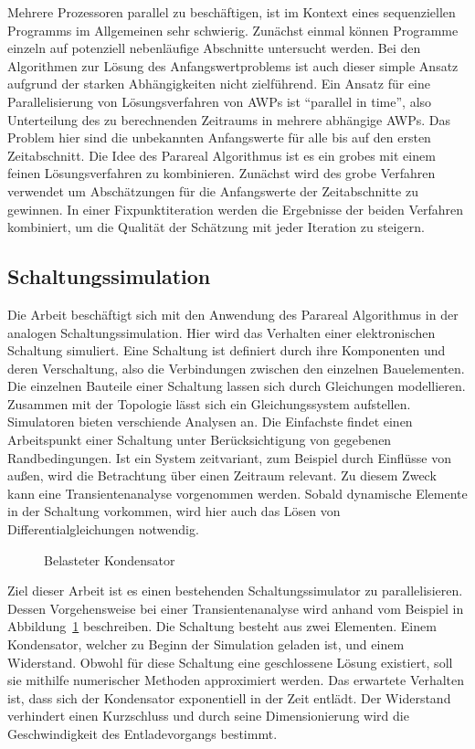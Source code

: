 Mehrere Prozessoren parallel zu beschäftigen, ist im Kontext eines sequenziellen Programms im Allgemeinen sehr schwierig. Zunächst einmal können Programme einzeln auf potenziell nebenläufige Abschnitte untersucht werden. Bei den Algorithmen zur Lösung des Anfangswertproblems ist auch dieser simple Ansatz aufgrund der starken Abhängigkeiten nicht zielführend. Ein Ansatz für eine Parallelisierung von Lösungsverfahren von AWPs ist "`parallel in time"', also Unterteilung des zu berechnenden Zeitraums in mehrere abhängige AWPs. Das Problem hier sind die unbekannten Anfangswerte für alle bis auf den ersten Zeitabschnitt. Die Idee des Parareal Algorithmus ist es ein grobes mit einem feinen Lösungsverfahren zu kombinieren. Zunächst wird des grobe Verfahren verwendet um Abschätzungen für die Anfangswerte der Zeitabschnitte zu gewinnen. In einer Fixpunktiteration werden die Ergebnisse der beiden Verfahren kombiniert, um die Qualität der Schätzung mit jeder Iteration zu steigern.
\subsection*{Schaltungssimulation}
Die Arbeit beschäftigt sich mit den Anwendung des Parareal Algorithmus in der analogen Schaltungssimulation. Hier wird das Verhalten einer elektronischen Schaltung simuliert. Eine Schaltung ist definiert durch ihre Komponenten und deren Verschaltung, also die Verbindungen zwischen den einzelnen Bauelementen. Die einzelnen Bauteile einer Schaltung lassen sich durch Gleichungen modellieren. Zusammen mit der Topologie lässt sich ein Gleichungssystem aufstellen.\\

Simulatoren bieten verschiende Analysen an. Die Einfachste findet einen Arbeitspunkt einer Schaltung unter Berücksichtigung von gegebenen Randbedingungen. Ist ein System zeitvariant, zum Beispiel durch Einflüsse von außen, wird die Betrachtung über einen Zeitraum relevant. Zu diesem Zweck kann eine Transientenanalyse vorgenommen werden. Sobald dynamische Elemente in der Schaltung vorkommen, wird hier auch das Lösen von Differentialgleichungen notwendig.\\
\begin{figure}[ht]
    \centering
        \begin{circuitikz}[scale=1.0]
            
        \end{circuitikz}
    \caption{Belasteter Kondensator}
\label{fig:cap}
\end{figure}
Ziel dieser Arbeit ist es einen bestehenden Schaltungssimulator zu parallelisieren. Dessen Vorgehensweise bei einer Transientenanalyse wird anhand vom Beispiel in Abbildung~\ref{fig:cap} beschreiben. Die Schaltung besteht aus zwei Elementen. Einem Kondensator, welcher zu Beginn der Simulation geladen ist, und einem Widerstand. Obwohl für diese Schaltung eine geschlossene Lösung existiert, soll sie mithilfe numerischer Methoden approximiert werden. Das erwartete Verhalten ist, dass sich der Kondensator exponentiell in der Zeit entlädt. Der Widerstand verhindert einen Kurzschluss und durch seine Dimensionierung wird die Geschwindigkeit des Entladevorgangs bestimmt.

